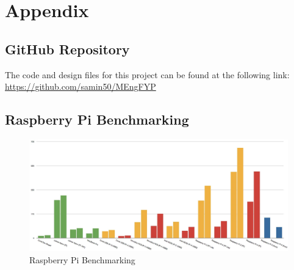 \newpage
\section{Appendix}
\label{sec:appendix}
\subsection{GitHub Repository}
\label{app:github}
The code and design files for this project can be found at the following link: \\
\url{https://github.com/samin50/MEngFYP}


\subsection{Raspberry Pi Benchmarking}
\begin{figure}[H]
  \centering
  \includegraphics[width=\textwidth]{imgs/articles/benchmarks.png}
  \caption{Raspberry Pi Benchmarking}
  \label{app:benchmarking}
\end{figure}